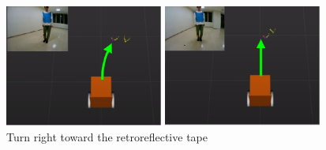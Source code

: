 \begin{figure}[h]
  \centering
  \begin{minipage}[c]{65mm} 
      \centering
      \includegraphics[height=40mm]{images/eps/RobotGuidance_learning_turn_right_(a)}
  \end{minipage}
  \begin{minipage}[c]{65mm} 
      \centering
      \includegraphics[height=40mm]{images/eps/RobotGuidance_learning_turn_right_(b)}
  \end{minipage}
  \caption{Turn right toward the retroreflective tape}
  \label{Fig:RobotGuidance_learning_turn_right}
\end{figure}

\newpage
